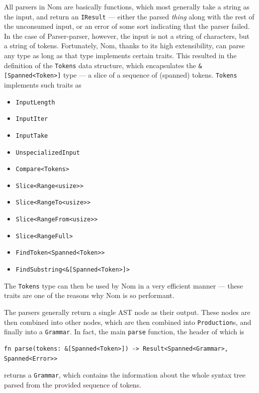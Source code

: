 \documentclass[english,engineering]{wizthesis}
\newcommand{\thisproject}{Parser-parser}
\begin{document}
All parsers in Nom are basically functions, which most generally take a string
as the input, and return an \texttt{IResult} --- either the parsed \emph{thing}
along with the rest of the unconsumed input, or an error of some sort indicating
that the parser failed. In the case of \thisproject{}, however, the input is not
a string of characters, but a string of tokens. Fortunately, Nom, thanks to its
high extensibility, can parse any type as long as that type implements certain
traits. This resulted in the definition of the \texttt{Tokens} data structure,
which encapsulates the \texttt{\&[Spanned<Token>]} type --- a slice of a sequence
of (spanned) tokens. \texttt{Tokens} implements such traits as
\begin{itemize}[noitemsep]
  \item \verb|InputLength|
  \item \verb|InputIter|
  \item \verb|InputTake|
  \item \verb|UnspecializedInput|
  \item \verb|Compare<Tokens>|
  \item \verb|Slice<Range<usize>>|
  \item \verb|Slice<RangeTo<usize>>|
  \item \verb|Slice<RangeFrom<usize>>|
  \item \verb|Slice<RangeFull>|
  \item \verb|FindToken<Spanned<Token>>|
  \item \verb|FindSubstring<&[Spanned<Token>]>|
\end{itemize}
The \texttt{Tokens} type can then be used by Nom in a very efficient manner ---
these traits are one of the reasons why Nom is so performant.

The parsers generally return a single AST node as their output. These nodes are
then combined into other nodes, which are then combined into
\texttt{Production}s, and finally into a \texttt{Grammar}. In fact, the main
\texttt{parse} function, the header of which is
\begin{verbatim}
fn parse(tokens: &[Spanned<Token>]) -> Result<Spanned<Grammar>, Spanned<Error>>
\end{verbatim}
returns a \texttt{Grammar}, which contains the information about the whole
syntax tree parsed from the provided sequence of tokens.
\end{document}
